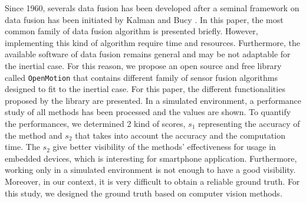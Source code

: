 Since 1960, severals data fusion has been developed after a seminal framework on data fusion has been initiated by Kalman and  Bucy \cite{kalman_new_1960}. In this paper, the most common family of data fusion algorithm is presented briefly. However, implementing this kind of algorithm require time and resources. Furthermore, the available software of data fusion remains general and may be not adaptable for the inertial case. For this reason, we propose an open source and free library called \texttt{OpenMotion} that contains different family of sensor fusion algorithms designed to fit to the inertial case. For this paper, the different functionalities proposed by the library are presented. In a simulated environment, a performance study of all methods has been processed and the values are shown. To quantify the performances, we determined 2 kind of scores,  $s_1$ representing the accuracy of the method and $s_2$ that takes into account the accuracy and the computation time. The $s_2$ give better visibility of the methods' effectiveness for usage in embedded devices, which is interesting for smartphone application. Furthermore, working only in a simulated environment is not enough to have a good visibility. Moreover, in our context, it is very difficult to obtain a reliable ground truth. For this study, we designed the ground truth  based on computer vision methods. 